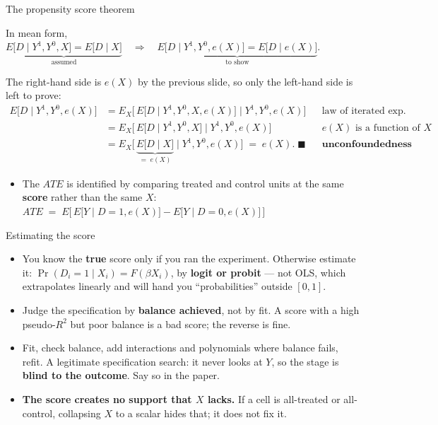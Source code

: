 \documentclass[
  11pt,
  ignorenonframetext,
  aspectratio=169,
]{beamer}
\providecommand{\tightlist}{%
  \setlength{\itemsep}{0pt}\setlength{\parskip}{0pt}}
\newcommand{\indep}{\perp\!\!\!\perp}
\begin{document}
\begin{frame}{The propensity score theorem}
\protect{}\label{the-propensity-score-theorem}
\begin{center}
\fbox{\;\textbf{Claim.}\quad If $(Y^1, Y^0) \indep D \mid X$, then $(Y^1, Y^0) \indep D \mid e(X)$\;}
\end{center}

\scriptsize

In mean form,
\(\underbrace{E\big[D \mid Y^1,Y^0, X\big] = E\big[D \mid X\big]}_{\text{assumed}} \quad \Longrightarrow \quad \underbrace{E\big[D \mid Y^1,Y^0, e(X)\big] = E\big[D \mid e(X)\big]}_{\text{to show}}\).

The right-hand side is \(e(X)\) by the previous slide, so only the
left-hand side is left to prove: \[
\begin{aligned}
E\big[D \mid Y^1,Y^0, e(X)\big]
&= E_{X}\Big[\, E\big[D \mid Y^1,Y^0, X, e(X)\big] \;\Big|\; Y^1,Y^0, e(X)\Big]
&& \text{law of iterated exp.} \\[1pt]
&= E_{X}\Big[\, E\big[D \mid Y^1,Y^0, X\big] \;\Big|\; Y^1,Y^0, e(X)\Big]
&& \text{$e(X)$ is a function of $X$} \\[1pt]
&= E_{X}\Big[\, \underbrace{E\big[D \mid X\big]}_{=\;e(X)} \;\Big|\; Y^1,Y^0, e(X)\Big] \;=\; e(X). \;\blacksquare
&& \textbf{unconfoundedness}
\end{aligned}
\]

\vfill

\normalsize

\begin{itemize}
\tightlist
\item
  The \(ATE\) is identified by comparing treated and control units at
  the same \textbf{score} rather than the same \(X\):
  \(ATE \;=\; E\Big[\, E\big[Y \mid D{=}1, e(X)\big] - E\big[Y \mid D{=}0, e(X)\big] \,\Big]\)
\end{itemize}
\end{frame}

\begin{frame}{Estimating the score}
\protect{}\label{estimating-the-score}
\begin{itemize}
\tightlist
\item
  You know the \textbf{true} score only if you ran the experiment.
  Otherwise estimate it: \(\Pr(D_i {=} 1 \mid X_i) = F(\beta X_i)\), by
  \textbf{logit or probit} --- not OLS, which extrapolates linearly and
  will hand you ``probabilities'' outside \([0,1]\).
\item
  Judge the specification by \textbf{balance achieved}, not by fit. A
  score with a high pseudo-\(R^2\) but poor balance is a bad score; the
  reverse is fine.
\item
  Fit, check balance, add interactions and polynomials where balance
  fails, refit. A legitimate specification search: it never looks at
  \(Y\), so the stage is \textbf{blind to the outcome}. Say so in the
  paper.
\item
  \textbf{The score creates no support that \(X\) lacks.} If a cell is
  all-treated or all-control, collapsing \(X\) to a scalar hides that;
  it does not fix it.
\end{itemize}
\end{frame}
\end{document}

